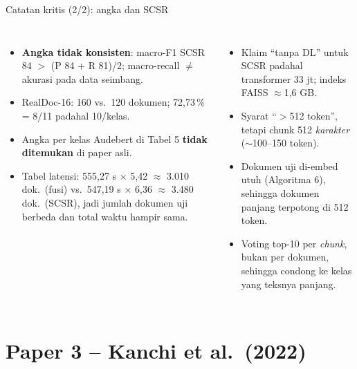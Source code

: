 \documentclass[aspectratio=169,10pt]{beamer}
\newcommand\kecil{\fontsize{8}{9.5}\selectfont}
\newcommand\awas[1]{\textcolor{merah}{\textbf{#1}}}
\begin{document}
\begin{frame}{Catatan kritis (2/2): angka dan SCSR}
  \begin{columns}[T]
    \begin{itemize}\kecil
      \item \awas{Angka tidak konsisten}: macro-F1 SCSR 84 $>$ (P 84 + R 81)/2; macro-recall $\neq$ akurasi pada data seimbang.
      \item RealDoc-16: 160 vs.\ 120 dokumen; 72,73\,\% = 8/11 padahal 10/kelas.
      \item Angka per kelas Audebert di Tabel 5 \awas{tidak ditemukan} di paper asli.
      \item Tabel latensi: 555,27 s $\times$ 5,42 $\approx$ 3.010 dok.\ (fusi) vs.\ 547,19 s $\times$ 6,36 $\approx$ 3.480 dok.\ (SCSR), jadi jumlah dokumen uji berbeda dan total waktu hampir sama.
    \end{itemize}
    \begin{itemize}\kecil
      \item Klaim ``tanpa DL'' untuk SCSR padahal transformer 33 jt; indeks FAISS $\approx$1,6 GB.
      \item Syarat ``$>$512 token'', tetapi chunk 512 \emph{karakter} ($\sim$100--150 token).
      \item Dokumen uji di-embed utuh (Algoritma 6), sehingga dokumen panjang terpotong di 512 token.
      \item Voting top-10 per \emph{chunk}, bukan per dokumen, sehingga condong ke kelas yang teksnya panjang.
    \end{itemize}
  \end{columns}
\end{frame}

\section{Paper 3 -- Kanchi et al.\ (2022)}
\end{document}
